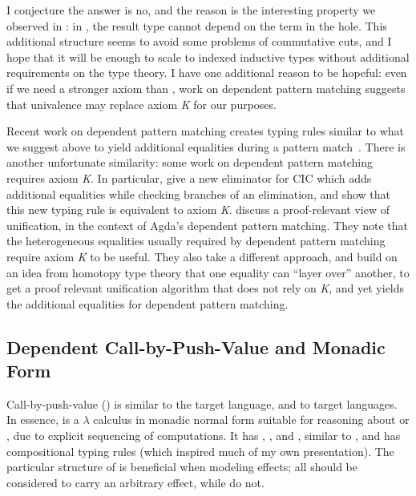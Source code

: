 I conjecture the answer is no, and the reason is the interesting property we
observed in : in , the result type cannot
depend on the term in the hole.
This additional structure seems to avoid some problems of commutative
cuts, and I hope that it will be enough to scale  to indexed inductive
types without additional requirements on the type theory.
I have one additional reason to be hopeful: even if we need a stronger axiom than
, work on dependent pattern matching suggests that univalence may replace
axiom \emph{K} for our purposes.

Recent work on dependent pattern matching creates typing rules similar to what we
suggest above to yield additional equalities during a pattern
match~\cite{barras2008:new-cic-elim,cockx2016}.
There is another unfortunate similarity: some work on dependent pattern matching
requires axiom \emph{K}.
In particular, \citet{barras2008:new-cic-elim} give a new eliminator for CIC
which adds additional equalities while checking branches of an elimination, and show
that this new typing rule is equivalent to axiom \emph{K}.
\citet{cockx2016} discuss a proof-relevant view of unification, in the context
of Agda's dependent pattern matching.
They note that the heterogeneous equalities usually required by dependent
pattern matching require axiom \emph{K} to be useful.
They also take a different approach, and build on an idea from homotopy type
theory that one equality can ``layer over'' another, to get a proof relevant
unification algorithm that does not rely on \emph{K}, and yet yields the
additional equalities for dependent pattern matching.

\subsection{Dependent Call-by-Push-Value and Monadic Form}
Call-by-push-value () is similar to the  target
language, and to  target languages.
In essence,  is a \(\lambda\) calculus in monadic normal form
suitable for reasoning about  or , due to explicit
sequencing of computations.
It has , , and , similar to
, and has compositional typing rules (which inspired much of my own
presentation).
The particular structure of  is beneficial when modeling effects; all
 should be considered to carry an arbitrary effect, while
 do not.

